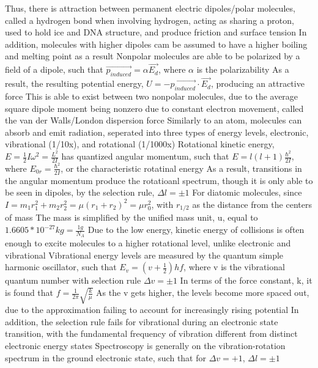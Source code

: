 \documentclass[11 pt, twoside]{article}
\newenvironment{outline*}
{
	\begin{outline}[enumerate]
	}
	{\end{outline}
}
\begin{document}
\begin{outline*}
		\3 Thus, there is attraction between permanent electric dipoles/polar molecules, called a hydrogen bond when involving hydrogen, acting as sharing a proton, used to hold ice and DNA structure, and produce friction and surface tension
		\3 In addition, molecules with higher dipoles cam be assumed to have a higher boiling and melting point as a result
	\2 Nonpolar molecules are able to be polarized by a field of a dipole, such that $\vec{p_{induced}} = \alpha \vec{E_d}$, where $\alpha$ is the polarizability
		\3 As a result, the resulting potential energy, $U = -\vec{p_{induced}} \cdot \vec{E_d}$, producing an attractive force
		\3 This is able to exist between two nonpolar molecules, due to the average square dipole moment being nonzero due to constant electron movement, called the van der Walls/London dispersion force
\1 Similarly to an atom, molecules can absorb and emit radiation, seperated into three types of energy levels, electronic, vibrational (1/10x), and rotational (1/1000x)
	\2 Rotational kinetic energy, $E = \frac{1}{2}I\omega^2 = \frac{L^2}{2I}$ has quantized angular momentum, such that $E = l(l + 1)\frac{\hbar^2}{2I}$, where $E_{0r} = \frac{\hbar^2}{2I}$, or the characteristic rotatinal energy
		\3 As a result, transitions in the angular momentum produce the rotatioanl spectrum, though it is only able to be seen in dipoles, by the selection rule, $\Delta l = \pm 1$
		\3 For diatomic molecules, since $I = m_1r_1^2 + m_2r_2^2 = \mu (r_1 + r_2)^2 = \mu r_0^2$, with $r_{1/2}$ as the distance from the centers of mass
			\4 The mass is simplified by the unified mass unit, u, equal to $1.6605 * 10^{-27} kg = \frac{1 g}{N_A}$
		\3 Due to the low energy, kinetic energy of collisions is often enough to excite molecules to a higher rotational level, unlike electronic and vibrational
	\2 Vibrational energy levels are measured by the quantum simple harmonic oscillator, such that $E_v = (v + \frac{1}{2})hf$, where v is the vibrational quantum number with selection rule $\Delta v = \pm 1$
		\3 In terms of the force constant, k, it is found that $f = \frac{1}{2\pi}\sqrt{\frac{k}{\mu}}$
		\3 As the v gets higher, the levels become more spaced out, due to the approximation failing to account for increasingly rising potential
		\3 In addition, the selection rule fails for vibrational during an electronic state transition, with the fundamental frequency of vibration different from distinct electronic energy states
	\2 Spectroscopy is generally on the vibration-rotation spectrum in the ground electronic state, such that for $\Delta v = +1$, $\Delta l = \pm 1$

\end{outline*}
\end{document}
